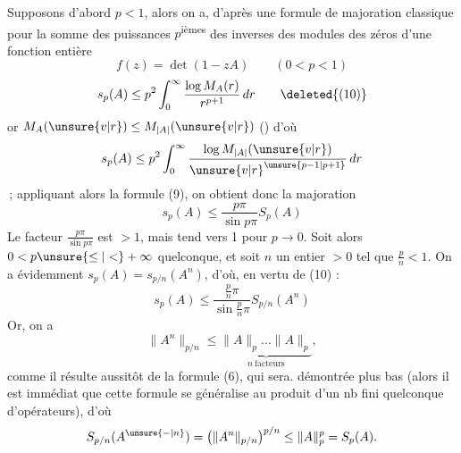 Supposons d'abord $p<1$, alors on a, d'après
une formule de majoration classique pour la
somme des puissances $p$\textsuperscript{ièmes} des inverses des
modules des zéros d'une fonction entière
\[
f(z)=\det(1-zA)\qquad(0<p<1)
\]
\[
s_p(A)\leq p^2\int_0^\infty\frac{\log M_A(r)}{r^{p+1}}\,dr\tag*{\deleted{(10)}}
\]
or $M_A(\unsure{v|r})\leq M_{|A|}(\unsure{v|r})$ (\unsure{\ldots\ --\ --}) d'où
\[
s_p(A)\leq p^2\int_0^\infty\frac{\log M_{|A|}(\unsure{v|r})}{{\unsure{v|r}}^{\unsure{p-1|p+1}}}\,dr
\]
\,; appliquant alors la formule
(9), on obtient donc la majoration
\[
s_p(A)\leq\frac{p\pi}{\sin p\pi}S_p(A)\tag*{(10)}
\]
Le facteur $\frac{p\pi}{\sin p\pi}$ est $>1$, mais tend vers 1
pour $p\to0$. Soit alors $0<p\unsure{\leq|<}+\infty$ quelconque,
et soit $n$ un entier $>0$ tel que $\frac{p}{n}<1$.
On a évidemment $s_p(A)=s_{p/n}(A^n)$, d'où, en
vertu de (10) :
\[
s_p(A)\leq\frac{\frac{p}{n}\pi}{\sin\frac{p}{n}\pi}S_{p/n}(A^n)
\]
Or, on a 
\[
\|A^n\|_{p/n}\leq\underbrace{\|A\|_p\ldots\|A\|_p}_{n\ \text{facteurs}},
\]
comme il résulte aussitôt de la formule (6), qui sera.
démontrée plus bas (alors il est immédiat
que cette formule se généralise au produit d'un
nb fini quelconque d'opérateurs), d'où
\[
S_{p/n}(A^{\unsure{{-}|n}})=\left(\|A^n\|_{p/n}\right)^{p/n}
\leq\|A\|_p^p=S_p(A).
\]

